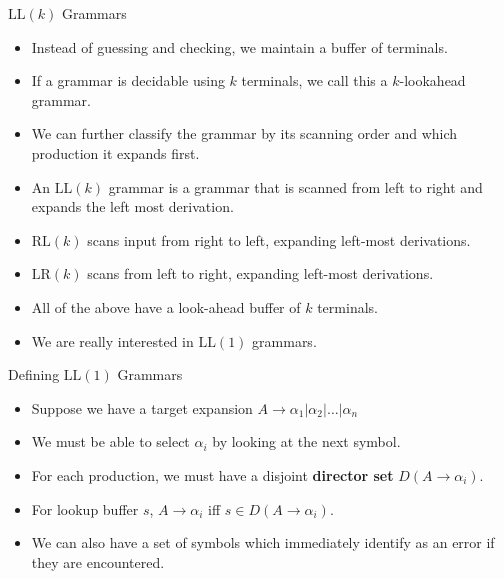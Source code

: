 \documentclass[]{beamer}
\begin{document}
\begin{frame}{$\mathrm{LL}(k)$ Grammars}
  \begin{itemize}[<+->]
    \item Instead of guessing and checking, we maintain a buffer of terminals.
    \item If a grammar is decidable using $k$ terminals, we call this a $k$-lookahead grammar.
    \item We can further classify the grammar by its scanning order and which production it expands first.
    \item An $\mathrm{LL}(k)$ grammar is a grammar that is scanned from left to right and expands the left most derivation.
    \item $\mathrm{RL}(k)$ scans input from right to left, expanding left-most derivations.
    \item $\mathrm{LR}(k)$ scans from left to right, expanding left-most derivations.
    \item All of the above have a look-ahead buffer of $k$ terminals.
    \item We are really interested in $\mathrm{LL}(1)$ grammars.
  \end{itemize}
\end{frame}

\begin{frame}{Defining $\mathrm{LL}(1)$ Grammars}
  \begin{itemize}[<+->]
      \item Suppose we have a target expansion $A \rightarrow \alpha_1 | \alpha_2 | \ldots | \alpha_n$
      \item We must be able to select $\alpha_i$ by looking at the next symbol.
      \item For each production, we must have a disjoint \textbf{director set} $D(A\rightarrow \alpha_i)$.
      \item For lookup buffer $s$, $A \rightarrow \alpha_i$ iff $s \in D(A \rightarrow \alpha_i)$.
      \item We can also have a set of symbols which immediately identify as an error if they are encountered.
  \end{itemize}
\end{frame}
\end{document}
